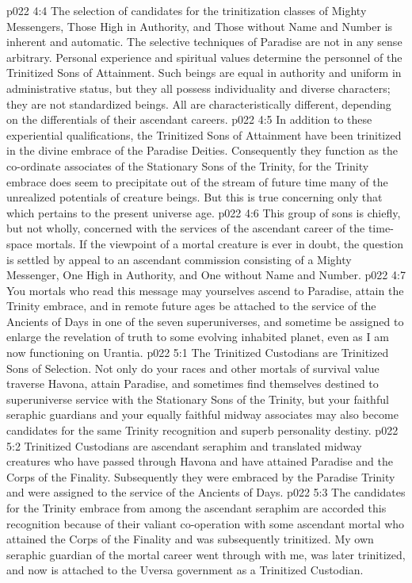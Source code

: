 \vs p022 4:4 \pc The selection of candidates for the trinitization classes of Mighty Messengers, Those High in Authority, and Those without Name and Number is inherent and automatic. The selective techniques of Paradise are not in any sense arbitrary. Personal experience and spiritual values determine the personnel of the Trinitized Sons of Attainment. Such beings are equal in authority and uniform in administrative status, but they all possess individuality and diverse characters; they are not standardized beings. All are characteristically different, depending on the differentials of their ascendant careers.
\vs p022 4:5 In addition to these experiential qualifications, the Trinitized Sons of Attainment have been trinitized in the divine embrace of the Paradise Deities. Consequently they function as the co\hyp{}ordinate associates of the Stationary Sons of the Trinity, for the Trinity embrace does seem to precipitate out of the stream of future time many of the unrealized potentials of creature beings. But this is true concerning only that which pertains to the present universe age.
\vs p022 4:6 This group of sons is chiefly, but not wholly, concerned with the services of the ascendant career of the time\hyp{}space mortals. If the viewpoint of a mortal creature is ever in doubt, the question is settled by appeal to an ascendant commission consisting of a Mighty Messenger, One High in Authority, and One without Name and Number.
\vs p022 4:7 You mortals who read this message may yourselves ascend to Paradise, attain the Trinity embrace, and in remote future ages be attached to the service of the Ancients of Days in one of the seven superuniverses, and sometime be assigned to enlarge the revelation of truth to some evolving inhabited planet, even as I am now functioning on Urantia.
\vs p022 5:1 The Trinitized Custodians are Trinitized Sons of Selection. Not only do your races and other mortals of survival value traverse Havona, attain Paradise, and sometimes find themselves destined to superuniverse service with the Stationary Sons of the Trinity, but your faithful seraphic guardians and your equally faithful midway associates may also become candidates for the same Trinity recognition and superb personality destiny.
\vs p022 5:2 Trinitized Custodians are ascendant seraphim and translated midway creatures who have passed through Havona and have attained Paradise and the Corps of the Finality. Subsequently they were embraced by the Paradise Trinity and were assigned to the service of the Ancients of Days.
\vs p022 5:3 The candidates for the Trinity embrace from among the ascendant seraphim are accorded this recognition because of their valiant co\hyp{}operation with some ascendant mortal who attained the Corps of the Finality and was subsequently trinitized. My own seraphic guardian of the mortal career went through with me, was later trinitized, and now is attached to the Uversa government as a Trinitized Custodian.
